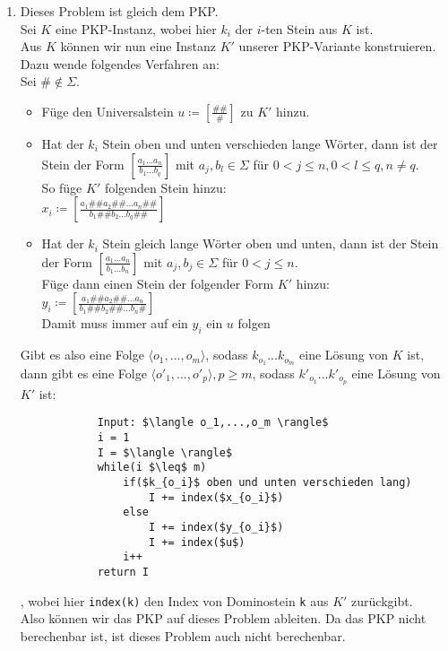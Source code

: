 \documentclass[a4paper,11pt]{scrartcl}
\begin{document}
\begin{enumerate}[label=\alph*)]
	\item	Dieses Problem ist gleich dem PKP.\\
			Sei $K$ eine PKP-Instanz, wobei hier $k_i$ der $i$-ten Stein aus $K$ ist.\\
			Aus $K$ können wir nun eine Instanz $K'$ unserer PKP-Variante konstruieren. Dazu wende folgendes Verfahren an:\\
			Sei $\# \not\in \Sigma$.
			\begin{itemize}
			\item Füge den Universalstein $u \coloneqq \left[ \frac{\#\#}{\#} \right]$ zu $K'$ hinzu.
			\item Hat der $k_i$ Stein oben und unten verschieden lange Wörter, dann ist der Stein der Form $\left[ \frac{a_1...a_n}{b_1...b_q} \right]$ mit $a_j, b_l \in \Sigma$ für $0<j\leq n, 0<l\leq q, n \neq q$.\\
			      So füge $K'$ folgenden Stein hinzu:\\
			      $x_i \coloneqq \left[ \frac{a_1\#\#a_2\#\#...a_n\#\#}{b_1\#\#b_2...b_q\#\#} \right]$
			\item Hat der $k_i$ Stein gleich lange Wörter oben und unten, dann ist der Stein der Form $\left[ \frac{a_1...a_n}{b_1...b_n} \right]$ mit $a_j, b_j \in \Sigma$ für $0<j\leq n$.\\
				  Füge dann einen Stein der folgender Form $K'$ hinzu:\\
				  $y_i \coloneqq \left[ \frac{a_1\#\#a_2\#\#...a_n}{b_1\#\#b_2\#\#...b_n\#} \right]$\\
				  Damit muss immer auf ein $y_i$ ein $u$ folgen
			\end{itemize}
			Gibt es also eine Folge $\langle o_1,...,o_m \rangle$, sodass $k_{o_1} ... k_{o_m}$ eine Lösung von $K$ ist, dann gibt es eine Folge $\langle o'_1,...,o'_p \rangle , p \geq m$, sodass $k'_{o_1} ... k'_{o_p}$ eine Lösung von $K'$ ist:
			\begin{lstlisting}
			Input: $\langle o_1,...,o_m \rangle$
			i = 1
			I = $\langle \rangle$
			while(i $\leq$ m)
				if($k_{o_i}$ oben und unten verschieden lang)
					I += index($x_{o_i}$)
				else
					I += index($y_{o_i}$)
					I += index($u$)
				i++
			return I
			\end{lstlisting}
			, wobei hier \verb|index(k)| den Index von Dominostein \verb|k| aus $K'$ zurückgibt.\\
			Also können wir das PKP auf dieses Problem ableiten. Da das PKP nicht berechenbar ist, ist dieses Problem auch nicht berechenbar.
	\end{enumerate}
	
\end{document}

